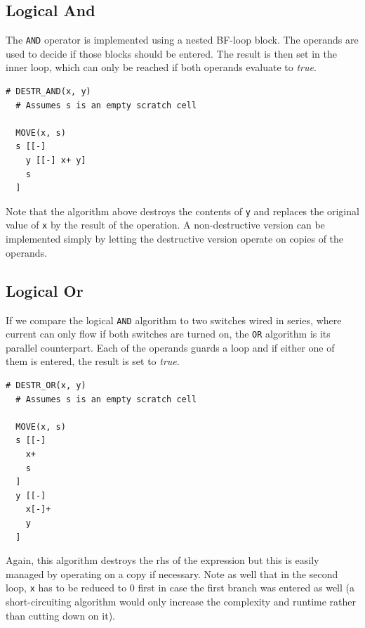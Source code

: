 \subsection{Logical And}
The \texttt{AND} operator is implemented using a nested BF-loop block. The operands are used to decide if those blocks should be entered. The result is then set in the inner loop, which can only be reached if both operands evaluate to \emph{true}.

\vspace{0.5cm}\noindent\begin{minipage}{\linewidth}
\begin{lstlisting}[style=brainfuck]
  # DESTR_AND(x, y)
  # Assumes s is an empty scratch cell

  MOVE(x, s)
  s [[-]
    y [[-] x+ y]
    s
  ]
\end{lstlisting}
\end{minipage}
%
Note that the algorithm above destroys the contents of \texttt{y} and replaces the original value of \texttt{x} by the result of the operation. A non-destructive version can be implemented simply by letting the destructive version operate on copies of the operands.

\subsection{Logical Or}
If we compare the logical \texttt{AND} algorithm to two switches wired in series, where current can only flow if both switches are turned on, the \texttt{OR} algorithm is its parallel counterpart. Each of the operands guards a loop and if either one of them is entered, the result is set to \emph{true}.

\vspace{0.5cm}\noindent\begin{minipage}{\linewidth}
\begin{lstlisting}[style=brainfuck]
  # DESTR_OR(x, y)
  # Assumes s is an empty scratch cell
  
  MOVE(x, s)
  s [[-]
    x+
    s
  ]
  y [[-]
    x[-]+
    y
  ]
\end{lstlisting}
\end{minipage}
%
Again, this algorithm destroys the rhs of the expression but this is easily managed by operating on a copy if necessary. Note as well that in the second loop, \texttt{x} has to be reduced to 0 first in case the first branch was entered as well (a short-circuiting algorithm would only increase the complexity and runtime rather than cutting down on it).

